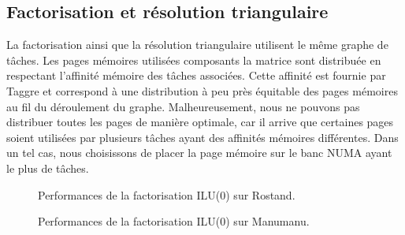 \subsection{Factorisation et résolution triangulaire}
La factorisation ainsi que la résolution triangulaire utilisent le même graphe de tâches.
%
Les pages mémoires utilisées composants la matrice sont distribuée en respectant l'affinité mémoire des tâches associées.
%
Cette affinité est fournie par Taggre et correspond à une distribution à peu près équitable des pages mémoires au fil du déroulement du graphe.
%
Malheureusement, nous ne pouvons pas distribuer toutes les pages de manière optimale, car il arrive que certaines pages soient utilisées par plusieurs tâches ayant des affinités mémoires différentes.
%
Dans un tel cas, nous choisissons de placer la page mémoire sur le banc NUMA ayant le plus de tâches.



\begin{figure}[!h]
     \begin{center}
    \end{center}
    \caption{Performances de la factorisation ILU(0) sur Rostand.}
\end{figure}

\begin{figure}[!h]
     \begin{center}
    \end{center}
    \caption{Performances de la factorisation ILU(0) sur Manumanu.}
\end{figure}

